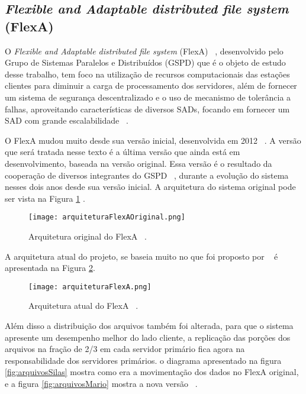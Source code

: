     \subsection{\textit{Flexible and Adaptable distributed file system} (FlexA)} \label{flexa}
	 
	 O \textit{Flexible and Adaptable distributed file system} (FlexA) ~\cite{silas}, desenvolvido pelo Grupo de Sistemas Paralelos e Distribuídos (GSPD) que é o objeto de estudo desse trabalho, tem foco na utilização de recursos computacionais das estações clientes para diminuir a carga de processamento dos servidores, além de fornecer um sistema de segurança descentralizado e o uso de mecanismo de tolerância a falhas, aproveitando características de diversos SADs, focando em fornecer um SAD com grande escalabilidade ~\cite{silas}.
	
	 O FlexA mudou muito desde sua versão inicial, desenvolvida em 2012 ~\cite{mario}. A versão que será tratada nesse texto é a última versão que ainda está em desenvolvimento, baseada na versão original. Essa versão é o resultado da cooperação de diversos integrantes do GSPD ~\cite{mario}, durante a evolução do sistema nesses dois anos desde sua versão inicial. A arquitetura do sistema original pode ser vista na Figura \ref{fig:arquiteturaFlexaSilas} .
	 
	 \begin{figure}[!ht]
	 \centering
	 \texttt{[image: arquiteturaFlexAOriginal.png]}
	 \caption{Arquitetura original do FlexA ~\cite{silas}.}
	 \label{fig:arquiteturaFlexaSilas}
	 \end{figure}
	 
	 A arquitetura atual do projeto, se baseia muito no que foi proposto por ~\cite{silas} é apresentada na Figura \ref{fig:arquiteturaFlexaMario}.
	 
	 \begin{figure}[!ht]
	 \centering
	 \texttt{[image: arquiteturaFlexA.png]}
	 \caption{Arquitetura atual do FlexA ~\cite{mario}.}
	 \label{fig:arquiteturaFlexaMario}
	 \end{figure}
	 
	 Além disso a distribuição dos arquivos também foi alterada, para que o sistema apresente um desempenho melhor do lado cliente, a replicação das porções dos arquivos na fração de 2/3 em cada servidor primário fica agora na responsabilidade dos servidores primários. o diagrama apresentado na figura \ref{fig:arquivosSilas} mostra como era a movimentação dos dados no FlexA original, e a figura \ref{fig:arquivosMario} mostra a nova versão ~\cite{mario}.
	 
